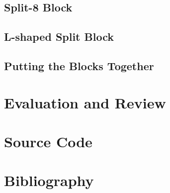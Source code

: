 \documentclass[a4paper]{report}
\begin{document}
\section{Split-8 Block} \indent

\section{L-shaped Split Block} \indent

\section{Putting the Blocks Together} \indent

\chapter{Evaluation and Review}

\appendix
\chapter{Source Code}

\chapter{Bibliography}
\end{document}
